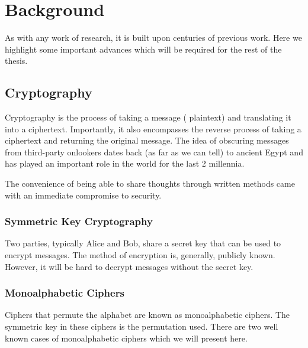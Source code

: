 %
%
\graphicspath{{./chapters/chapter02/fig02/}}

\let\textcircled=\pgftextcircled
\chapter{Background}
\label{chap:background}

As with any work of research, it is built upon centuries of previous work. Here we highlight some important advances which will be required for the rest of the thesis.

\section{Cryptography}
\label{sec1:crypto}

Cryptography is the process of taking a message ({\color{bristol-red} plaintext}) and translating it into a {\color{bristol-red} ciphertext}. Importantly, it also encompasses the reverse process of taking a ciphertext and returning the original message. The idea of obscuring messages from third-party onlookers dates back (as far as we can tell) to ancient Egypt and has played an important role in the world for the last 2 millennia. 

The convenience of being able to share thoughts through written methods came with an immediate compromise to security.

\subsection{Symmetric Key Cryptography}

Two parties, typically Alice and Bob, share a secret key that can be used to encrypt messages. The method of encryption is, generally, publicly known. However, it will be hard to decrypt messages without the secret key.

\subsection{Monoalphabetic Ciphers}

Ciphers that permute the alphabet are known as {\color{bristol-red} monoalphabetic ciphers}. The symmetric key in these ciphers is the permutation used. There are two well known cases of monoalphabetic ciphers which we will present here. 

